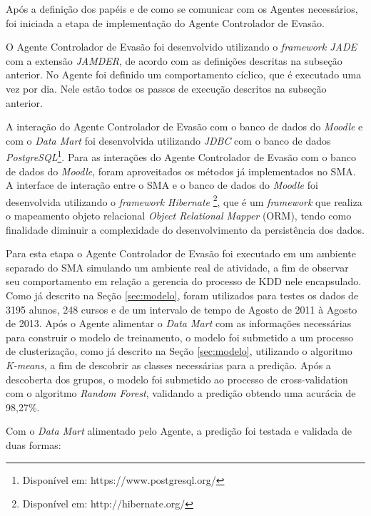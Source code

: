 Após a definição dos papéis e de como se comunicar com os Agentes necessários, foi iniciada a etapa de implementação do Agente Controlador de Evasão.


O Agente Controlador de Evasão foi desenvolvido utilizando o \textit{framework JADE} com a extensão \textit{JAMDER}, de acordo com as definições descritas na subseção anterior.
No Agente foi definido um comportamento cíclico, que é executado uma vez por dia. Nele estão todos os passos de execução descritos na subseção anterior.

A interação do Agente Controlador de Evasão com o banco de dados do \textit{Moodle} e com o \textit{Data Mart} foi desenvolvida utilizando \textit{JDBC} com o banco de dados \textit{PostgreSQL}\footnote{Disponível em: https://www.postgresql.org/}. Para as interações do Agente Controlador de Evasão com o banco de dados do \textit{Moodle}, foram aproveitados os métodos já implementados no SMA. A interface de interação entre o SMA e o banco de dados do \textit{Moodle} foi desenvolvida utilizando o \textit{framework Hibernate} \footnote{Disponível em: http://hibernate.org/}, que é um \textit{framework} que realiza o mapeamento objeto relacional \textit{Object Relational Mapper} (ORM), tendo como finalidade diminuir a complexidade do desenvolvimento da persistência dos dados.


Para esta etapa o Agente Controlador de Evasão foi executado em um ambiente separado do SMA simulando um ambiente real de atividade, a fim de observar seu comportamento em relação a gerencia do processo de KDD nele encapsulado. Como já descrito na Seção \ref{sec:modelo}, foram utilizados para testes os dados de 3195 alunos, 248 cursos e de um intervalo de tempo de Agosto de 2011 à Agosto de 2013. Após o Agente alimentar o \textit{Data Mart} com as informações necessárias para construir o modelo de treinamento, o modelo foi submetido a um processo de clusterização, como já descrito na Seção \ref{sec:modelo}, utilizando o algoritmo \textit{K-means}, a fim de descobrir as classes necessárias para a predição. Após a descoberta dos grupos, o modelo foi submetido ao processo de {cross-validation} com o algoritmo \textit{Random Forest}, validando a predição obtendo uma acurácia de 98,27\%.


 Com o \textit{Data Mart} alimentado pelo Agente, a predição foi testada e validada de duas formas:

